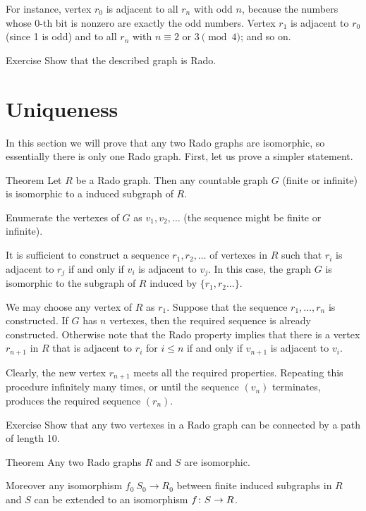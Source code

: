 For instance,  vertex $r_0$ is adjacent to all $r_n$ with odd $n$, because the numbers whose 0-th bit is nonzero are exactly the odd numbers.
Vertex $r_1$ is adjacent to $r_0$ (since 1 is odd) and to all $r_n$ with $n\equiv 2$ or $3 \pmod 4$;
and so on.

\begin{thm}{Exercise}
Show that the described graph is Rado.
\end{thm}


\section*{Uniqueness}

In this section we will prove that any two Rado graphs are isomorphic, so essentially there is only one Rado graph.
First, let us prove a simpler statement.

\begin{thm}{Theorem}\label{thm:rado-subgraph}
Let $R$ be a Rado graph.
Then any countable graph $G$ (finite or infinite) is isomorphic to a induced subgraph of $R$. 
\end{thm}

Enumerate the vertexes of $G$ as $v_1 , v_2 , \dots$ (the sequence might be finite or infinite).

It is sufficient to construct a sequence $r_1,r_2,\dots$ of vertexes in $R$ such that $r_i$ is adjacent to $r_j$ if and only if $v_i$ is adjacent to $v_j$.
In this case, the graph $G$ is isomorphic to the subgraph of $R$ induced by $\{r_1,r_2\dots\}$.

We may choose any vertex of $R$ as $r_1$.
Suppose that the sequence $r_1,\dots,r_n$ is constructed.
If $G$ has $n$ vertexes, then the required sequence is already constructed.
Otherwise note that the Rado property implies that there is a vertex $r_{n+1}$ in $R$ that is adjacent to $r_i$ for $i\le n$ if and only if $v_{n+1}$ is adjacent to $v_i$.

Clearly, the new vertex $r_{n+1}$ meets all the required properties.
Repeating this procedure infinitely many times, or until the sequence $(v_n)$ terminates, produces the required sequence $(r_n)$.
\qeds


\begin{thm}{Exercise} Show that any two vertexes in a Rado graph can be connected by a path of length 10. \end{thm}


\begin{thm}{Theorem}
Any two Rado graphs $R$ and $S$ are isomorphic.

Moreover any isomorphism $f_0\:S_0\to R_0$ between finite induced subgraphs in $R$ and $S$ can be extended to an isomorphism $f\:S\z\to R$.
\end{thm}

